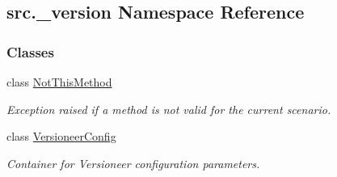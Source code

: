 \hypertarget{namespacesrc_1_1__version}{}\subsection{src.\+\_\+version Namespace Reference}
\label{namespacesrc_1_1__version}
\subsubsection*{Classes}
\begin{DoxyCompactItemize}
\item 
class \hyperlink{classsrc_1_1__version_1_1NotThisMethod}{Not\+This\+Method}
\begin{DoxyCompactList}\small\item\em Exception raised if a method is not valid for the current scenario. \end{DoxyCompactList}\item 
class \hyperlink{classsrc_1_1__version_1_1VersioneerConfig}{Versioneer\+Config}
\begin{DoxyCompactList}\small\item\em Container for Versioneer configuration parameters. \end{DoxyCompactList}\end{DoxyCompactItemize}
